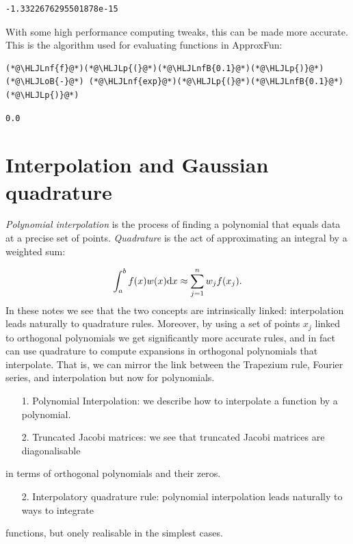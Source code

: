 \documentclass[12pt,a4paper]{article}
\newcommand{\HLJLnf}[1]{\textcolor[RGB]{66,102,213}{#1}}
\newcommand{\HLJLnfB}[1]{\textcolor[RGB]{59,151,46}{#1}}
\newcommand{\HLJLoB}[1]{\textcolor[RGB]{102,102,102}{\textbf{#1}}}
\newcommand{\HLJLp}[1]{#1}
\begin{document}
\begin{lstlisting}
-1.3322676295501878e-15
\end{lstlisting}


With some high performance computing tweaks, this can be made more accurate. This is the algorithm used for evaluating functions in ApproxFun:


\begin{lstlisting}
(*@\HLJLnf{f}@*)(*@\HLJLp{(}@*)(*@\HLJLnfB{0.1}@*)(*@\HLJLp{)}@*) (*@\HLJLoB{-}@*) (*@\HLJLnf{exp}@*)(*@\HLJLp{(}@*)(*@\HLJLnfB{0.1}@*)(*@\HLJLp{)}@*)
\end{lstlisting}

\begin{lstlisting}
0.0
\end{lstlisting}


\section{Interpolation and Gaussian quadrature}
\emph{Polynomial interpolation} is the process of finding a polynomial that equals data at a precise set of points. \emph{Quadrature} is the act of approximating an integral by a weighted sum:

\[
\int_a^b f(x) w(x) {\rm d}x \ensuremath{\approx} \sum_{j=1}^n w_j f(x_j).
\]
In these notes we see that the two concepts are intrinsically linked:  interpolation leads naturally to quadrature rules. Moreover, by using a set of points $x_j$ linked to orthogonal polynomials we get significantly more accurate rules, and in fact can use quadrature to compute expansions in orthogonal polynomials that interpolate. That is, we can mirror the link between the Trapezium rule, Fourier series, and interpolation but now for polynomials.

\begin{itemize}
\item[1. ] Polynomial Interpolation: we describe how to interpolate a function by a polynomial.


\item[2. ] Truncated Jacobi matrices: we see that truncated Jacobi matrices are diagonalisable

\end{itemize}
in terms of orthogonal polynomials and their zeros. 

\begin{itemize}
\item[2. ] Interpolatory quadrature rule: polynomial interpolation leads naturally to ways to integrate

\end{itemize}
functions, but onely realisable in the simplest cases.
\end{document}
